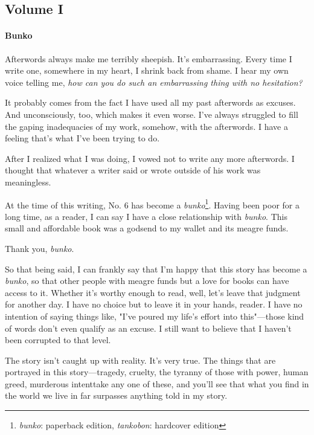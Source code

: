 
\subsection{Volume I}
\paragraph{Bunko}

Afterwords always make me terribly sheepish. It's embarrassing. Every
time I write one, somewhere in my heart, I shrink back from shame. I
hear my own voice telling me, \emph{how can you do such an embarrassing thing
with no hesitation?}

It probably comes from the fact I have used all my past afterwords as
excuses. And unconsciously, too, which makes it even worse. I've always
struggled to fill the gaping inadequacies of my work, somehow, with the
afterwords. I have a feeling that's what I've been trying to do.

After I realized what I was doing, I vowed not to write any more
afterwords. I thought that whatever a writer said or wrote outside of
his work was meaningless.

At the time of this writing, No. 6 has become a \emph{bunko}\footnote{\emph{bunko}: paperback edition, \emph{tankobon}: hardcover edition}.
Having been poor for a long time, as a reader, I can say I have a close
relationship with \emph{bunko}. This small and affordable book was a godsend to
my wallet and its meagre funds.

Thank you, \emph{bunko}.

So that being said, I can frankly say that I'm happy that this story has
become a \emph{bunko}, so that other people with meagre funds but a love for
books can have access to it. Whether it's worthy enough to read, well,
let's leave that judgment for another day. I have no choice but to leave
it in your hands, reader. I have no intention of saying things like,
"I've poured my life's effort into this"---those kind of words don't even
qualify as an excuse. I still want to believe that I haven't been
corrupted to that level.

The story isn't caught up with reality. It's very true. The things that
are portrayed in this story---tragedy, cruelty, the tyranny of those with
power, human greed, murderous intent\el take any one of these, and
you'll see that what you find in the world we live in far surpasses
anything told in my story.

